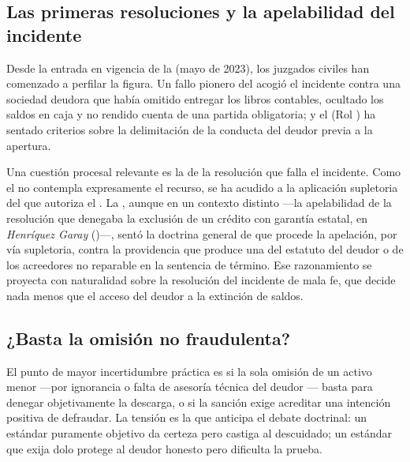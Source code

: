 \subsection{Las primeras resoluciones y la apelabilidad del incidente}

Desde la entrada en vigencia de la \Lreforma{} (mayo de 2023), los juzgados civiles han comenzado a
perfilar la figura. Un fallo pionero del 
acogió el incidente contra una sociedad deudora que había omitido entregar los libros contables,
ocultado los saldos en caja y no rendido cuenta de una partida obligatoria; y el
 (Rol ) ha sentado
criterios sobre la delimitación de la conducta del deudor previa a la
apertura.

Una cuestión procesal relevante es la  de la resolución que falla el
incidente. Como el  no contempla expresamente el recurso, se ha acudido a la aplicación
supletoria del \cpc{} que autoriza el . La \csup{}, aunque en un contexto distinto ---la
apelabilidad de la resolución que denegaba la exclusión de un crédito con garantía estatal, en
\emph{Henríquez Garay} ()---, sentó la doctrina general de que procede la apelación,
por vía supletoria, contra la providencia que produce una  del
estatuto del deudor o de los acreedores no reparable en la sentencia de término. Ese razonamiento se
proyecta con naturalidad sobre la resolución del incidente de mala fe, que decide nada menos que el
acceso del deudor a la extinción de saldos.

\subsection{¿Basta la omisión no fraudulenta?}

El punto de mayor incertidumbre práctica es si la sola omisión de un activo menor ---por
ignorancia o falta de asesoría técnica del deudor \mipe{}--- basta para denegar objetivamente
la descarga, o si la sanción exige acreditar una intención positiva de defraudar. La tensión es
la que anticipa el debate doctrinal: un estándar puramente objetivo da certeza pero castiga al
descuidado; un estándar que exija dolo protege al deudor honesto pero dificulta la prueba.

